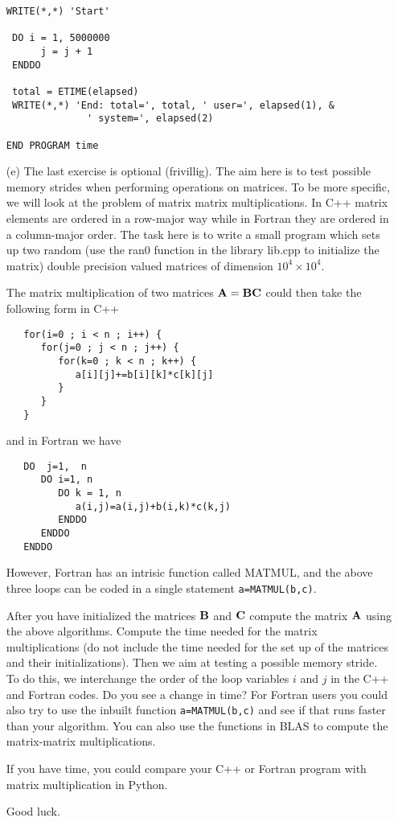 \documentclass[11pt,a4wide]{article}
\begin{document}
\begin{enumerate}
\begin{lstlisting}[title={Time in Fortran}]
 WRITE(*,*) 'Start'

 DO i = 1, 5000000  
      j = j + 1
 ENDDO

 total = ETIME(elapsed)
 WRITE(*,*) 'End: total=', total, ' user=', elapsed(1), &
              ' system=', elapsed(2)

END PROGRAM time
\end{lstlisting}



\item[(e)]  The last exercise is optional (frivillig). The aim here is to test possible memory strides when performing operations on matrices. To be more specific, we will look at the problem of matrix matrix multiplications. In C++ matrix elements are ordered in a row-major  way while in Fortran they are ordered in a column-major order.  
The task here is to write a small program which sets up two random (use the ran0 function in the library lib.cpp to initialize the matrix) double precision valued matrices of dimension $10^4\times 10^4$. 

The matrix multiplication 
of two matrices ${\bf A}={\bf BC}$ could then take
the following form in C++
\lstset{language=c++} 
\begin{lstlisting}
   for(i=0 ; i < n ; i++) {  
      for(j=0 ; j < n ; j++) {
         for(k=0 ; k < n ; k++) {
            a[i][j]+=b[i][k]*c[k][j]
         }
      }
   }  
\end{lstlisting}
and in Fortran  we have
\lstset{language=[90]Fortran} 
\begin{lstlisting}
   DO  j=1,  n
      DO i=1, n
         DO k = 1, n
            a(i,j)=a(i,j)+b(i,k)*c(k,j)
         ENDDO
      ENDDO
   ENDDO
\end{lstlisting}
However, Fortran has an intrisic function called MATMUL, and
the above three loops can be coded in a single statement
\lstinline{a=MATMUL(b,c)}.

After you have initialized the matrices ${\bf B}$ and ${\bf C}$ compute the matrix ${\bf A}$ using the above algorithms. Compute the time needed for the matrix multiplications (do not include the time needed for the set up of the matrices and their initializations).  Then we aim at testing a possible memory stride.  To do this,
we interchange the order of the loop variables $i$ and $j$ in the C++ and Fortran codes. Do you see a change in time? 
For Fortran users you could also try to use the inbuilt function \lstinline{a=MATMUL(b,c)} and see if that runs
faster than your algorithm.  You can also use the functions in BLAS to compute the matrix-matrix multiplications.

If you have time, you could compare your C++ or Fortran program with matrix multiplication in Python.

Good luck.
\end{enumerate}
\end{document}
